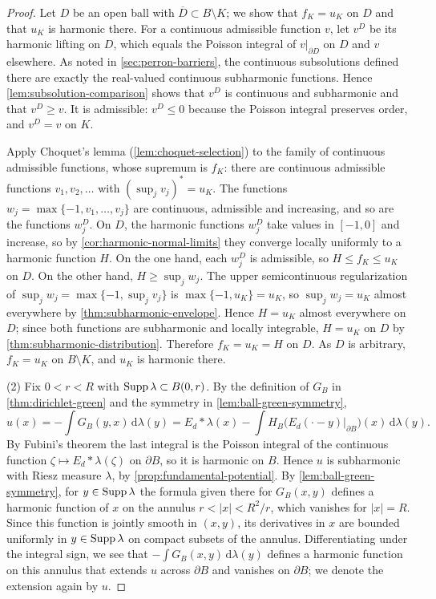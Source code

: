 \begin{proof}
Let $D$ be an open ball with $\overline D\subset B\setminus K$; we show that $f_K=u_K$ on $D$ and that $u_K$ is harmonic there. For a continuous admissible function $v$, let $v^D$ be its harmonic lifting on $D$, which equals the Poisson integral of $v|_{\partial D}$ on $D$ and $v$ elsewhere. As noted in \cref{sec:perron-barriers}, the continuous subsolutions defined there are exactly the real-valued continuous subharmonic functions. Hence \cref{lem:subsolution-comparison} shows that $v^D$ is continuous and subharmonic and that $v^D\geq v$. It is admissible: $v^D\leq0$ because the Poisson integral preserves order, and $v^D=v$ on $K$.

Apply Choquet's lemma (\cref{lem:choquet-selection}) to the family of continuous admissible functions, whose supremum is $f_K$: there are continuous admissible functions $v_1,v_2,\ldots$ with $(\sup_jv_j)^*=u_K$. The functions $w_j=\max\{-1,v_1,\ldots,v_j\}$ are continuous, admissible and increasing, and so are the functions $w_j^D$. On $D$, the harmonic functions $w_j^D$ take values in $[-1,0]$ and increase, so by \cref{cor:harmonic-normal-limits} they converge locally uniformly to a harmonic function $H$. On the one hand, each $w_j^D$ is admissible, so $H\leq f_K\leq u_K$ on $D$. On the other hand, $H\geq\sup_jw_j$. The upper semicontinuous regularization of $\sup_jw_j=\max\{-1,\sup_jv_j\}$ is $\max\{-1,u_K\}=u_K$, so $\sup_jw_j=u_K$ almost everywhere by \cref{thm:subharmonic-envelope}. Hence $H=u_K$ almost everywhere on $D$; since both functions are subharmonic and locally integrable, $H=u_K$ on $D$ by \cref{thm:subharmonic-distribution}. Therefore $f_K=u_K=H$ on $D$. As $D$ is arbitrary, $f_K=u_K$ on $B\setminus K$, and $u_K$ is harmonic there.

(2) Fix $0<r<R$ with $\operatorname{Supp}\lambda\subset B(0,r)$. By the definition of $G_B$ in \cref{thm:dirichlet-green} and the symmetry in \cref{lem:ball-green-symmetry},
\[
 u(x)=-\int G_B(y,x)\,\mathrm d\lambda(y)=E_d*\lambda(x)-\int H_B\bigl(E_d(\cdot-y)|_{\partial B}\bigr)(x)\,\mathrm d\lambda(y).
\]
By Fubini's theorem the last integral is the Poisson integral of the continuous function $\zeta\mapsto E_d*\lambda(\zeta)$ on $\partial B$, so it is harmonic on $B$. Hence $u$ is subharmonic with Riesz measure $\lambda$, by \cref{prop:fundamental-potential}. By \cref{lem:ball-green-symmetry}, for $y\in\operatorname{Supp}\lambda$ the formula given there for $G_B(x,y)$ defines a harmonic function of $x$ on the annulus $r<|x|<R^2/r$, which vanishes for $|x|=R$. Since this function is jointly smooth in $(x,y)$, its derivatives in $x$ are bounded uniformly in $y\in\operatorname{Supp}\lambda$ on compact subsets of the annulus. Differentiating under the integral sign, we see that $-\int G_B(x,y)\,\mathrm d\lambda(y)$ defines a harmonic function on this annulus that extends $u$ across $\partial B$ and vanishes on $\partial B$; we denote the extension again by $u$.


\end{proof}
